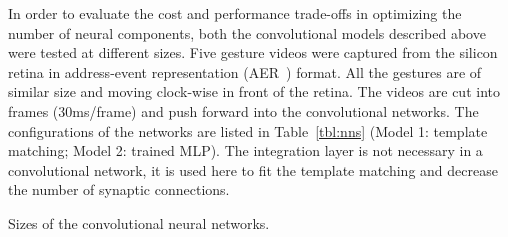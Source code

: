 \documentclass[journal]{journal}
\begin{document}
In order to evaluate the cost and performance trade-offs in optimizing the number of neural components, both the convolutional models described above were tested at different sizes. 
Five gesture videos were captured from the silicon retina in address-event representation (AER~\cite{lazzaro1995multi}) format.  
All the gestures are of similar size and moving clock-wise in front of the retina. 
The videos are cut into frames (30ms/frame) and push forward into the convolutional networks. 
The configurations of the networks are listed in Table~\ref{tbl:nns} (Model 1: template matching; Model 2: trained MLP). 
The integration layer is not necessary in a convolutional network, it is used here to fit the template matching and decrease the number of synaptic connections.

\begin{table}
\caption{Sizes of the convolutional neural networks.}
	\begin{subtable}{0.5\textwidth}
		

\end{subtable}
\end{table}
\end{document}
